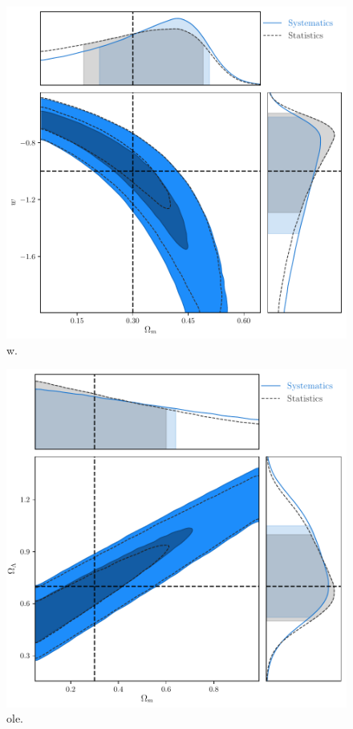 \documentclass[a4paper,fleqn,usenatbib]{mnras}
\begin{document}
\begin{figure}
	\begin{center}
		\includegraphics[width=\columnwidth]{combined_ApproximateModelW.pdf}
	\end{center}
	\caption{w.}
	\label{fig:combined_w}
\end{figure}
\begin{figure}
	\begin{center}
		\includegraphics[width=\columnwidth]{combined_ApproximateModelOl.pdf}
	\end{center}
	\caption{ole.}
	\label{fig:combined_ol}
\end{figure}
\end{document}
